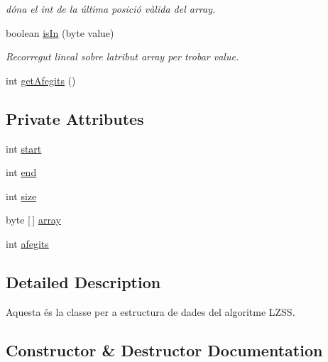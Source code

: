 \begin{DoxyCompactItemize}
\begin{DoxyCompactList}\small\item\em dóna el int de la última posició vàlida del array. \end{DoxyCompactList}\item 
boolean \hyperlink{classdomini_1_1utils_1_1ArrayCircular_aaf106d070b5937f2559a56257dc8cac3}{is\+In} (byte value)
\begin{DoxyCompactList}\small\item\em Recorregut lineal sobre l\textquotesingle{}atribut array per trobar value. \end{DoxyCompactList}\item 
int \hyperlink{classdomini_1_1utils_1_1ArrayCircular_a1c65dd3b452fa82ab8827885a7a2fbe1}{get\+Afegits} ()
\end{DoxyCompactItemize}
\subsection*{Private Attributes}
\begin{DoxyCompactItemize}
\item 
int \hyperlink{classdomini_1_1utils_1_1ArrayCircular_a5206ac4a02c25c16c8a8ed50f65ea87b}{start}
\item 
int \hyperlink{classdomini_1_1utils_1_1ArrayCircular_ad3f40ecb62a2503382fa5d1fa2025912}{end}
\item 
int \hyperlink{classdomini_1_1utils_1_1ArrayCircular_a1ffca5e28ff4dc515eddde9cd5926efd}{size}
\item 
byte \mbox{[}$\,$\mbox{]} \hyperlink{classdomini_1_1utils_1_1ArrayCircular_a2af77a58adf605b58d79a1879a0a593f}{array}
\item 
int \hyperlink{classdomini_1_1utils_1_1ArrayCircular_a08291d877b2d4c71c219df6f983b279a}{afegits}
\end{DoxyCompactItemize}


\subsection{Detailed Description}
Aquesta és la classe per a estructura de dades del algoritme L\+Z\+SS. 

\subsection{Constructor \& Destructor Documentation}
\mbox{\label{classdomini_1_1utils_1_1ArrayCircular_add69c3bd37b2a3ef6069bd3b5df93fec}} 
